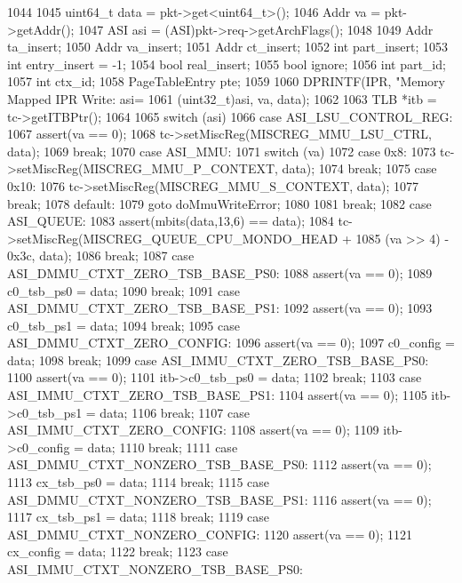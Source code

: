 \begin{DoxyCode}
1044 {
1045     uint64_t data = pkt->get<uint64_t>();
1046     Addr va = pkt->getAddr();
1047     ASI asi = (ASI)pkt->req->getArchFlags();
1048 
1049     Addr ta_insert;
1050     Addr va_insert;
1051     Addr ct_insert;
1052     int part_insert;
1053     int entry_insert = -1;
1054     bool real_insert;
1055     bool ignore;
1056     int part_id;
1057     int ctx_id;
1058     PageTableEntry pte;
1059 
1060     DPRINTF(IPR, "Memory Mapped IPR Write: asi=%
1061          (uint32_t)asi, va, data);
1062 
1063     TLB *itb = tc->getITBPtr();
1064 
1065     switch (asi) {
1066       case ASI_LSU_CONTROL_REG:
1067         assert(va == 0);
1068         tc->setMiscReg(MISCREG_MMU_LSU_CTRL, data);
1069         break;
1070       case ASI_MMU:
1071         switch (va) {
1072           case 0x8:
1073             tc->setMiscReg(MISCREG_MMU_P_CONTEXT, data);
1074             break;
1075           case 0x10:
1076             tc->setMiscReg(MISCREG_MMU_S_CONTEXT, data);
1077             break;
1078           default:
1079             goto doMmuWriteError;
1080         }
1081         break;
1082       case ASI_QUEUE:
1083         assert(mbits(data,13,6) == data);
1084         tc->setMiscReg(MISCREG_QUEUE_CPU_MONDO_HEAD +
1085                     (va >> 4) - 0x3c, data);
1086         break;
1087       case ASI_DMMU_CTXT_ZERO_TSB_BASE_PS0:
1088         assert(va == 0);
1089         c0_tsb_ps0 = data;
1090         break;
1091       case ASI_DMMU_CTXT_ZERO_TSB_BASE_PS1:
1092         assert(va == 0);
1093         c0_tsb_ps1 = data;
1094         break;
1095       case ASI_DMMU_CTXT_ZERO_CONFIG:
1096         assert(va == 0);
1097         c0_config = data;
1098         break;
1099       case ASI_IMMU_CTXT_ZERO_TSB_BASE_PS0:
1100         assert(va == 0);
1101         itb->c0_tsb_ps0 = data;
1102         break;
1103       case ASI_IMMU_CTXT_ZERO_TSB_BASE_PS1:
1104         assert(va == 0);
1105         itb->c0_tsb_ps1 = data;
1106         break;
1107       case ASI_IMMU_CTXT_ZERO_CONFIG:
1108         assert(va == 0);
1109         itb->c0_config = data;
1110         break;
1111       case ASI_DMMU_CTXT_NONZERO_TSB_BASE_PS0:
1112         assert(va == 0);
1113         cx_tsb_ps0 = data;
1114         break;
1115       case ASI_DMMU_CTXT_NONZERO_TSB_BASE_PS1:
1116         assert(va == 0);
1117         cx_tsb_ps1 = data;
1118         break;
1119       case ASI_DMMU_CTXT_NONZERO_CONFIG:
1120         assert(va == 0);
1121         cx_config = data;
1122         break;
1123       case ASI_IMMU_CTXT_NONZERO_TSB_BASE_PS0:
}}
\end{DoxyCode}
